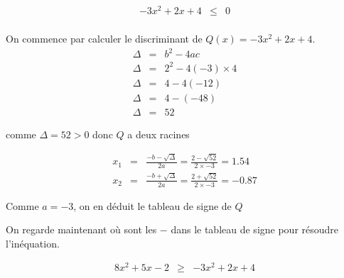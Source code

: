 \documentclass[a4paper,10pt, table]{/media/documents/Cours/Prof/Enseignements/tools/style/classDS}
\begin{document}
\begin{questions}
        \begin{eqnarray*}
            - 3 x^{  2 } + 2 x + 4 & \leq &0  \\
        \end{eqnarray*}
    \begin{solution}
        On commence par calculer le discriminant de $Q(x) = - 3 x^{  2 } + 2 x + 4$.
        \begin{eqnarray*}
            \Delta & = & b^2-4ac \\
            \Delta & = & 2^{  2 } - 4 ( -3 ) \times 4 \\ 
\Delta & = & 4 - 4 ( -12 ) \\ 
\Delta & = & 4 - ( -48 ) \\ 
\Delta & = & 52
        \end{eqnarray*}

        
            comme $\Delta = 52 > 0$ donc $Q$ a deux racines

            \begin{eqnarray*}
                x_1 & = & \frac{-b - \sqrt{\Delta}}{2a} =  \frac{2 - \sqrt{52}}{2 \times -3} = 1.54 \\
                x_2 & = & \frac{-b + \sqrt{\Delta}}{2a} =  \frac{2 + \sqrt{52}}{2 \times -3} = -0.87
            \end{eqnarray*}


        
        Comme $a = -3$, on en déduit le tableau de signe de $Q$
            \begin{center}
            \end{center}
        On regarde maintenant où sont les $-$ dans le tableau de signe pour résoudre l'inéquation.
        \end{solution}

        \begin{eqnarray*}
            8 x^{  2 } + 5 x - 2 & \geq & - 3 x^{  2 } + 2 x + 4 
        \end{eqnarray*}

        


\end{questions}
\end{document}
